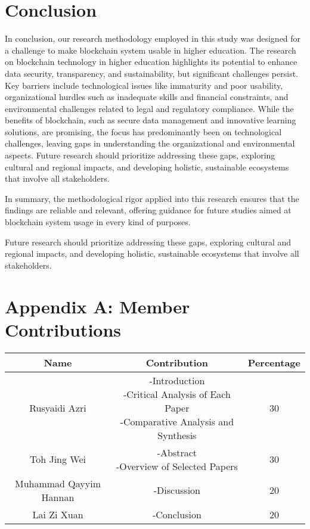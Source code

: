 \documentclass[12pt,a4paper]{article}
\begin{document}
\section{Conclusion}
In conclusion, our research methodology employed in this study was designed for a challenge to make blockchain system usable in higher education. The research on blockchain technology in higher education highlights its potential to enhance data security, transparency, and sustainability, but significant challenges persist. Key barriers include technological issues like immaturity and poor usability, organizational hurdles such as inadequate skills and financial constraints, and environmental challenges related to legal and regulatory compliance. While the benefits of blockchain, such as secure data management and innovative learning solutions, are promising, the focus has predominantly been on technological challenges, leaving gaps in understanding the organizational and environmental aspects. Future research should prioritize addressing these gaps, exploring cultural and regional impacts, and developing holistic, sustainable ecosystems that involve all stakeholders.

In summary, the methodological rigor applied into this research ensures that the findings are reliable and relevant, offering guidance for future studies aimed at blockchain system usage in every kind of purposes.

Future research should prioritize addressing these gaps, exploring cultural and regional impacts, and developing holistic, sustainable ecosystems that involve all stakeholders.
\newpage


\appendix
\section{Appendix A: Member Contributions}

\begin{tabular}{|c|c|c|}
    \hline
    Name & Contribution & Percentage \\
    \hline
    Rusyaidi Azri& \parbox{7cm}{-Introduction\\-Critical Analysis of Each Paper\\-Comparative Analysis and Synthesis} & 30 \\
    \hline
    Toh Jing Wei&\parbox{7cm}{-Abstract\\-Overview of Selected Papers} & 30 \\
    \hline
    Muhammad Qayyim Hannan& -Discussion & 20 \\
    \hline
    Lai Zi Xuan& -Conclusion & 20 \\
    \hline
     
\end{tabular}
\end{document}

